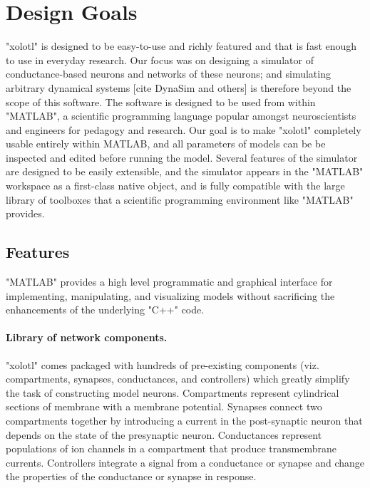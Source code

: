 \documentclass{frontiersSCNS} %
\begin{document}
% 
% 

\section{Design Goals}
\label{design}

"xolotl" is designed to be easy-to-use and richly featured and that is fast enough to use in everyday research. Our focus was on designing a simulator of conductance-based neurons and networks of these neurons; and simulating arbitrary dynamical systems [cite DynaSim and others] is therefore beyond the scope of this software. The software is designed to be used from within "MATLAB", a scientific programming language popular amongst neuroscientists and engineers for pedagogy and research. Our goal is to make "xolotl" completely usable entirely within MATLAB, and all parameters of models can be be inspected and edited before running the model. Several features of the simulator are designed to be easily extensible, and the simulator appears in the "MATLAB" workspace as a first-class native object, and is fully compatible with the large library of toolboxes that a scientific programming environment like "MATLAB" provides. 


\subsection{Features}
\label{features}

"MATLAB" provides a high level programmatic and graphical interface for implementing, manipulating, and visualizing models without sacrificing the enhancements of the underlying "C++" code.

\paragraph{Library of network components.} "xolotl" comes packaged with hundreds of pre-existing components (viz. compartments, synapses, conductances, and controllers) which greatly simplify the task of constructing model neurons. Compartments represent cylindrical sections of membrane with a membrane potential. Synapses connect two compartments together by introducing a current in the post-synaptic neuron that depends on the state of the presynaptic neuron. Conductances represent populations of ion channels in a compartment that produce transmembrane currents. Controllers integrate a signal from a conductance or synapse and change the properties of the conductance or synapse in response.
\end{document}
